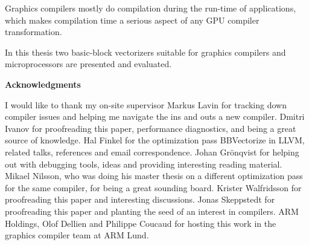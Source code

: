 \documentclass[12pt,a4paper,onecolumn,twoside,openright]{report}
\begin{document}
Graphics compilers mostly do compilation during the run-time of applications, which makes compilation time a serious aspect of any GPU compiler transformation.

In this thesis two basic-block vectorizers suitable for graphics compilers and microprocessors are presented and evaluated.






\newpage
{}
{}
\begin{center}
\textbf{\large Acknowledgments}
\end{center}

I would like to thank my on-site supervisor Markus Lavin for tracking down compiler issues and helping me navigate the ins and outs a new compiler.
Dmitri Ivanov for proofreading this paper, performance diagnostics, and being a great source of knowledge.
Hal Finkel for the optimization pass BBVectorize in LLVM, related talks, references and email correspondence.
Johan Grönqvist for helping out with debugging tools, ideas and providing interesting reading material.
Mikael Nilsson, who was doing his master thesis on a different optimization pass for the same compiler, for being a great sounding board.
Krister Walfridsson for proofreading this paper and interesting discussions.
Jonas Skeppstedt for proofreading this paper and planting the seed of an interest in compilers.
ARM Holdings, Olof Dellien and Philippe Coucaud for hosting this work in the graphics compiler team at ARM Lund.





\tableofcontents










\newpage
{} \label{listoffig}
\listoffigures
\end{document}

